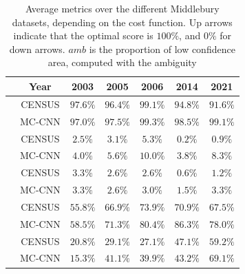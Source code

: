 \begin{table}[ht!]
\centering
\renewcommand{\arraystretch}{1.5}
\begin{tabular}{|c|c||c|c|c|c|c|}
\cline{2-7}
\rowcolor{lightgray}
\multicolumn{1}{c|}{\cellcolor{white}}& Year & 2003 & 2005 & 2006 & 2014 & 2021 \\ \hline

\rowcolor{color_census}
\cellcolor{white} & CENSUS & $97.6\%$ & $96.4\%$ & $99.1\%$ & $94.8\%$ & $91.6\%$\\\cline{2-7}

\rowcolor{color_mccnn}
\multirow{-2}{*}{\cellcolor{white} $acc$ $\uparrow$} & MC-CNN & $97.0\%$ & $97.5\%$ & $99.3\%$ & $98.5\%$ & $99.1\%$\\

\rowcolor{color_census}\hline
\cellcolor{white} & CENSUS & $2.5\%$ & $3.1\%$ & $5.3\%$ & $0.2\%$ & $0.9\%$\\\cline{3-7} 

\rowcolor{color_mccnn}
\multirow{-2}{*}{\cellcolor{white} $\varepsilon_{~~~}$ $\downarrow$} & MC-CNN & $4.0\%$ & $5.6\%$ & $10.0\%$ & $3.8\%$ & $8.3\%$\\

\rowcolor{color_census}\hline
\cellcolor{white} & CENSUS & $3.3\%$ & $2.6\%$ & $2.6\%$ & $0.6\%$ & $1.2\%$\\\cline{3-7} 

\rowcolor{color_mccnn}
\multirow{-2}{*}{\cellcolor{white} $s_{rel}$ $\downarrow$} & MC-CNN & $3.3\%$ & $2.6\%$ & $3.0\%$ & $1.5\%$ & $3.3\%$\\

\rowcolor{color_census}\hline
\cellcolor{white} & CENSUS & $55.8\%$ & $66.9\%$ & $73.9\%$ & $70.9\%$ & $67.5\%$\\\cline{3-7} 

\rowcolor{color_mccnn}
\multirow{-2}{*}{\cellcolor{white} $o_{rel}$ $\downarrow$} & MC-CNN & $58.5\%$ & $71.3\%$ & $80.4\%$ & $86.3\%$ & $78.0\%$\\

\rowcolor{color_census}\hline
\cellcolor{white} & CENSUS & $20.8\%$ & $29.1\%$ & $27.1\%$ & $47.1\%$ & $59.2\%$\\\cline{3-7} 

\rowcolor{color_mccnn}
\multirow{-2}{*}{\cellcolor{white} $p_{amb}$} & MC-CNN & $15.3\%$ & $41.1\%$ & $39.9\%$ & $43.2\%$ & $69.1\%$\\\hline


\end{tabular}
\renewcommand{\arraystretch}{1}
\caption{Average metrics over the different Middlebury datasets, depending on the cost function. Up arrows indicate that the optimal score is $100\%$, and $0\%$ for down arrows. $amb$ is the proportion of low confidence area, computed with the ambiguity}\label{tab:metric_average}
\end{table}

